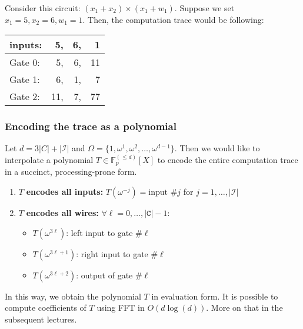 \documentclass[../lecture-notes.tex]{subfiles}
\begin{document}
\begin{example}
Consider this circuit: \((x_1 + x_2)\times(x_1 + w_1)\). Suppose we set \(x_1 = 5, x_2 = 6, w_1 = 1\). Then, the computation trace would be following:

\begin{center}
\begin{tabular}{l rrr}
  inputs: & 5, & 6, & 1 \\ \hline
  Gate 0: & 5, & 6, & 11 \\
  Gate 1: & 6, & 1, & 7 \\
  Gate 2: & 11, & 7, & 77 \\ 
\end{tabular}
\end{center}
\end{example}

\subsubsection{Encoding the trace as a polynomial}

Let \(d = 3|C| + |\mathcal{I}|\) and \(\Omega = \{1, \omega^1, \omega^2, \dots, \omega^{d-1}\}\). Then we would like to interpolate a polynomial \(T \in \mathbb{F}_p^{(\leq d)}[X]\) to encode the entire computation trace in a succinct, processing-prone form.

\begin{enumerate}
    \item \(T\) \textbf{encodes all inputs:} \( T(\omega^{-j}) = \text{input \#} j\) for \(j = 1, \dots, |\mathcal{I}| \)
    \item \(T\) \textbf{encodes all wires:} \( \forall \ell = 0, \dots, |\texttt{C}| - 1: \)
    \begin{itemize}
        \item \( T(\omega^{3\ell}) \): left input to gate \#\( \ell \)
        \item \( T(\omega^{3\ell+1}) \): right input to gate \#\( \ell \)
        \item \( T(\omega^{3\ell+2}) \): output of gate \#\( \ell \)
    \end{itemize}
\end{enumerate}

\begin{remark}
In this way, we obtain the polynomial \(T\) in evaluation form. It is possible to compute coefficients of \(T\) using FFT in \(O(d\log(d))\). More on that in the subsequent lectures.
\end{remark}
\end{document}
